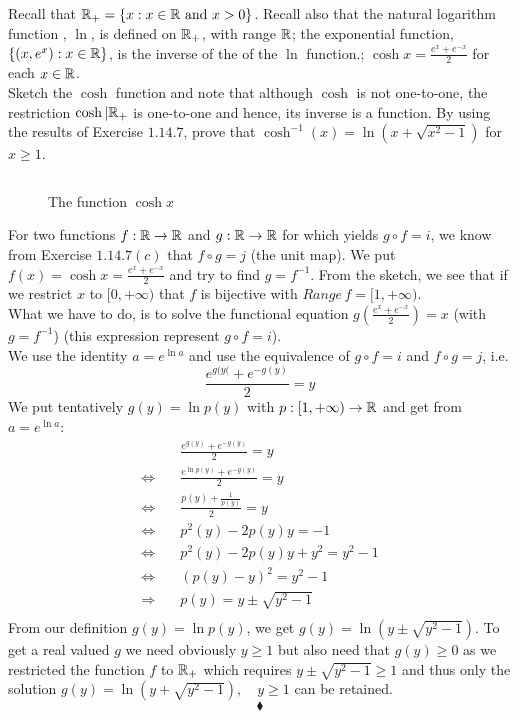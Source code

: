 \subsection{}
\begin{tcolorbox}
Recall that $\mathbb{R}_{+}=\left\{x:x\in \mathbb{R} \text{ and } x> 0\right\}$. Recall also that the natural logarithm function , $\ln$, is defined on $\mathbb{R}_{+}$, with range $\mathbb{R}$; the exponential function, $ \{(x,e^x):x\in \mathbb{R}\}$, is the inverse of the of the $\ln$ function.; $\cosh x = \frac{ e^x+e^{-x}}{2}$ for each $x\in \mathbb{R}$. \\
Sketch the $\cosh$ function and note that although $\cosh$ is not one-to-one, the restriction $\cosh |\mathbb{R}_{+}$ is one-to-one and hence, its inverse is a function. By using the results of  Exercise $1.14.7$, prove that $\cosh^{-1}(x)= \ln \left(x+\sqrt{x^2-1}\right)$ for $x\ge 1$.
\end{tcolorbox}
$$ $$ 
\begin{figure}[H]%
    \centering
    
\caption{The function $\cosh x$}
\label{fig:fig_p8b}
\end{figure}
For two functions $f:\mathbb{R}\rightarrow\mathbb{R}$ and $g:\mathbb{R}\rightarrow\mathbb{R}$ for which yields $g\circ f=i$, we know from Exercise $1.14.7(c)$  that  $f\circ g=j$ (the unit map). We put  $f(x)= \cosh x = \frac{ e^x+e^{-x}}{2}$ and try to find $g= f^{-1}$. From the sketch, we see that if we restrict $x$ to $[0,+\infty)$ that $f$ is bijective with $Range\, f= [1,+\infty)$. \\
What we have to do, is to solve the functional equation $g\left(\frac{ e^x+e^{-x}}{2}\right)=x$ (with $g=f^{-1}$) (this expression represent $g\circ f=i$).\\
We use the identity $a=e^{\ln a}$ and use the equivalence of  $g\circ f=i$ and $f\circ g=j$, i.e. $$\frac{ e^{g(y(}+e^{-g(y)}}{2} =y$$
 We put tentatively $g(y) = \ln p(y)$ with $p: [1,+\infty)\rightarrow\mathbb{R}$ and get from $a=e^{\ln a}$:
 \begin{align*}
 &\frac{ e^{g(y)}+e^{-g(y)}}{2} =y\\
 \Leftrightarrow \quad &\frac{ e^{\ln p(y)}+e^{-g(y)}}{2} =y\\
 \Leftrightarrow \quad &\frac{ p(y)+\frac{1}{p(y)}}{2} =y\\
 \Leftrightarrow \quad &p^2(y)-2 p(y)y  =-1\\
 \Leftrightarrow \quad &p^2(y)-2 p(y)y+y^2  =y^2-1\\
 \Leftrightarrow \quad &\left(p(y)-y\right)^2  =y^2-1\\
 \Rightarrow \quad &p(y)= y\pm \sqrt{y^2-1}\\
 \end{align*}
 From our definition $g(y) = \ln p(y)$, we get $g(y) = \ln \left(y\pm \sqrt{y^2-1}\right)$. To get a real valued $g$ we need obviously $y\ge 1$ but also need that $g(y)\ge 0$ as we restricted the function $f$ to $\mathbb{R}_{+}$ which requires $y\pm \sqrt{y^2-1}\ge 1$ and thus only the solution $g(y) = \ln \left(y+ \sqrt{y^2-1}\right),\quad y\ge 1$ can be retained.
$$\blacklozenge$$

